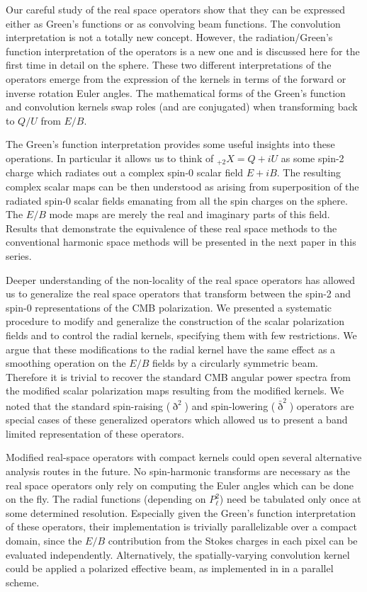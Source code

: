 Our careful study of the real space operators show that they can be expressed either as Green's functions or as convolving beam functions.  The convolution interpretation is not a totally new concept.    However, the radiation/Green's function interpretation of the operators is a new one and is discussed here for the first time in detail on the sphere. These two different interpretations of the operators emerge from the expression of the kernels in terms of the forward or inverse rotation Euler angles.  The mathematical forms of the Green's function and convolution kernels swap roles (and are conjugated) when transforming back to $Q/U$ from $E/B$.

The Green's function interpretation provides some useful insights into these operations. In particular it allows us to think of ${}_{+2}X=Q+iU$ as some spin-2 charge which radiates out a complex spin-0 scalar field $E+iB$. The resulting complex scalar maps can be then understood as arising from superposition of the radiated spin-0 scalar fields emanating from all the spin charges on the sphere.  The $E/B$ mode maps are merely the real and imaginary parts of this field. Results that demonstrate the equivalence of these real space methods to the conventional harmonic space methods will be presented in the next paper in this series.

Deeper understanding of the non-locality of the real space operators has allowed us to generalize the real space operators that transform between the spin-2 and spin-0 representations of the CMB polarization. We presented a systematic procedure to modify and generalize the construction of the scalar polarization fields and to control the radial kernels, specifying them with few restrictions.  We argue that these modifications to the radial kernel have the same effect as a smoothing operation on the $E/B$ fields by a circularly symmetric beam.  Therefore it is trivial to recover the standard CMB angular power spectra from the modified scalar polarization maps resulting from the modified kernels.  We noted that the standard spin-raising ($\eth^2$) and spin-lowering ($\bar{\eth}^2$) operators are special cases of these generalized operators which allowed us to present a band limited representation of these operators. 

Modified real-space operators with compact kernels could open several alternative analysis routes in the future.  No spin-harmonic transforms are necessary as the real space operators only rely on computing the Euler angles which can be done on the fly.  The radial functions (depending on $P_{\ell}^{2}$) need be tabulated only once at some determined resolution.  Especially given the Green's function interpretation of these operators, their implementation is trivially parallelizable over a compact domain, since the $E/B$ contribution from the Stokes charges in each pixel can be evaluated independently.  Alternatively, the spatially-varying convolution kernel could be applied a polarized effective beam, as implemented in \cite{2011ApJS..193....5M} in a parallel scheme.


